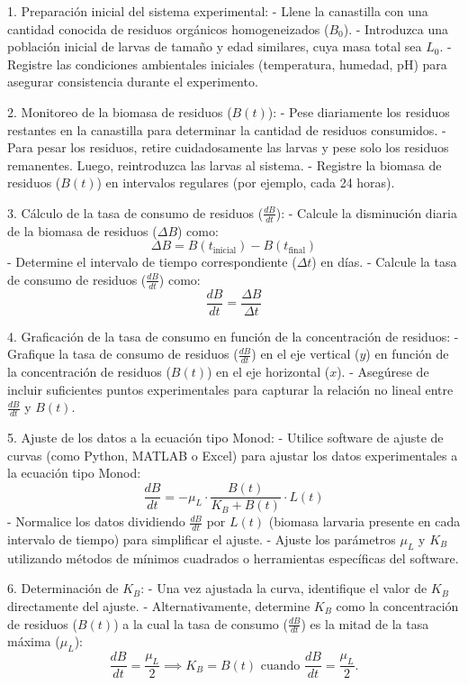 \documentclass[12pt]{article}
\begin{document}
1. Preparación inicial del sistema experimental:
   - Llene la canastilla con una cantidad conocida de residuos orgánicos homogeneizados ($B_0$).
   - Introduzca una población inicial de larvas de tamaño y edad similares, cuya masa total sea $L_0$.
   - Registre las condiciones ambientales iniciales (temperatura, humedad, pH) para asegurar consistencia durante el experimento.

2. Monitoreo de la biomasa de residuos ($B(t)$):
   - Pese diariamente los residuos restantes en la canastilla para determinar la cantidad de residuos consumidos.
   - Para pesar los residuos, retire cuidadosamente las larvas y pese solo los residuos remanentes. Luego, reintroduzca las larvas al sistema.
   - Registre la biomasa de residuos ($B(t)$) en intervalos regulares (por ejemplo, cada 24 horas).

3. Cálculo de la tasa de consumo de residuos ($\frac{dB}{dt}$):
   - Calcule la disminución diaria de la biomasa de residuos ($\Delta B$) como:
     \[
     \Delta B = B(t_{\text{inicial}}) - B(t_{\text{final}})
     \]
   - Determine el intervalo de tiempo correspondiente ($\Delta t$) en días.
   - Calcule la tasa de consumo de residuos ($\frac{dB}{dt}$) como:
     \[
     \frac{dB}{dt} = \frac{\Delta B}{\Delta t}
     \]

4. Graficación de la tasa de consumo en función de la concentración de residuos:
   - Grafique la tasa de consumo de residuos ($\frac{dB}{dt}$) en el eje vertical ($y$) en función de la concentración de residuos ($B(t)$) en el eje horizontal ($x$).
   - Asegúrese de incluir suficientes puntos experimentales para capturar la relación no lineal entre $\frac{dB}{dt}$ y $B(t)$.

5. Ajuste de los datos a la ecuación tipo Monod:
   - Utilice software de ajuste de curvas (como Python, MATLAB o Excel) para ajustar los datos experimentales a la ecuación tipo Monod:
     \[
     \frac{dB}{dt} = -\mu_L \cdot \frac{B(t)}{K_B + B(t)} \cdot L(t)
     \]
   - Normalice los datos dividiendo $\frac{dB}{dt}$ por $L(t)$ (biomasa larvaria presente en cada intervalo de tiempo) para simplificar el ajuste.
   - Ajuste los parámetros $\mu_L$ y $K_B$ utilizando métodos de mínimos cuadrados o herramientas específicas del software.

6. Determinación de $K_B$:
   - Una vez ajustada la curva, identifique el valor de $K_B$ directamente del ajuste.
   - Alternativamente, determine $K_B$ como la concentración de residuos ($B(t)$) a la cual la tasa de consumo ($\frac{dB}{dt}$) es la mitad de la tasa máxima ($\mu_L$):
     \[
     \frac{dB}{dt} = \frac{\mu_L}{2} \implies K_B = B(t) \text{ cuando } \frac{dB}{dt} = \frac{\mu_L}{2}.
     \]
\end{document}
